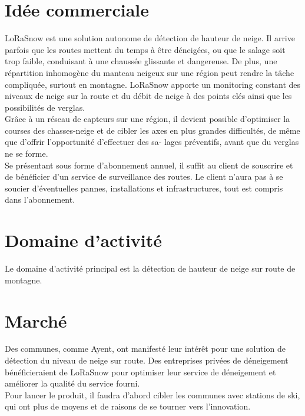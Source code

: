 \section{Idée commerciale}
LoRaSnow est une solution autonome de détection de hauteur de neige. 
Il arrive parfois que les routes mettent du temps à être déneigées, ou que le salage soit trop
faible, conduisant à une chaussée glissante et dangereuse. De plus, une répartition inhomogène du manteau neigeux sur une
région peut rendre la tâche compliquée, surtout en montagne. LoRaSnow apporte un monitoring constant
des niveaux de neige sur la route et du débit de neige à des points clés ainsi que les possibilités de verglas.\\[0.2cm]
Grâce à un réseau de capteurs sur une région, il devient possible d’optimiser la courses des chasses-neige
et de cibler les axes en plus grandes difficultés, de même que d’offrir l’opportunité d’effectuer des sa-
lages préventifs, avant que du verglas ne se forme.\\[0.2cm]
Se présentant sous forme d'abonnement annuel, il suffit au client de souscrire et de bénéficier
d'un service de surveillance des routes. Le client n'aura pas à se soucier d'éventuelles pannes, installations
et infrastructures, tout est compris dans l'abonnement.

\section{Domaine d'activité}
Le domaine d'activité principal est la détection de hauteur de neige sur route de montagne.

\section{Marché}
Des communes, comme Ayent, ont manifesté leur intérêt pour une solution
de détection du niveau de neige sur route.
Des entreprises privées de déneigement bénéficieraient de LoRaSnow pour
optimiser leur service de déneigement et améliorer la qualité du service
fourni.\\
Pour lancer le produit, il faudra d'abord cibler les communes avec stations de ski,
qui ont plus de moyens et de raisons de se tourner vers l'innovation.\newpage

